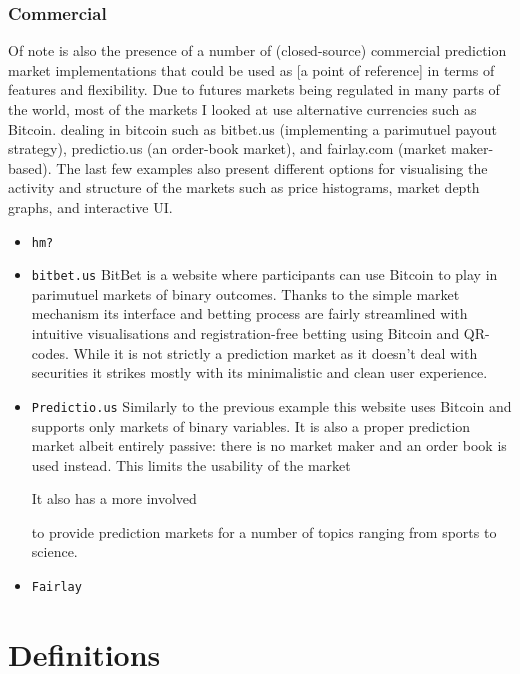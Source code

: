 \documentclass[bsc,frontabs,twoside,singlespacing,parskip,deptreport]{infthesis}     %
\begin{document}
\subsection{ Commercial }
	Of note is also the presence of a number of (closed-source) commercial prediction market implementations that could be used as [a point of reference] in terms of features and flexibility. Due to futures markets being regulated in many parts of the world, most of the markets I looked at use alternative currencies such as Bitcoin. 
 dealing in bitcoin such as bitbet.us (implementing a parimutuel payout strategy), predictio.us (an order-book market), and fairlay.com (market maker-based). The last few examples also present different options for visualising the activity and structure of the markets such as price histograms, market depth graphs, and interactive UI.
\begin{itemize}

\item {\tt hm? }

\item {\tt bitbet.us}
	BitBet is a website where participants can use Bitcoin to play in parimutuel markets of binary outcomes. Thanks to the simple market mechanism its interface and betting process are fairly streamlined with intuitive visualisations and registration-free betting using Bitcoin and QR-codes. While it is not strictly a prediction market as it doesn't deal with securities it strikes mostly with its minimalistic and clean user experience. 

\item {\tt Predictio.us}
	Similarly to the previous example this website uses Bitcoin and supports only markets of binary variables. It is also a proper prediction market albeit entirely passive: there is no market maker and an order book is used instead. This limits the usability of the market 

	It also has a more involved 

to provide prediction markets for a number of topics ranging from sports to science. 
\item {\tt Fairlay}	
	

\end{itemize}
\chapter{Definitions}
\end{document}
